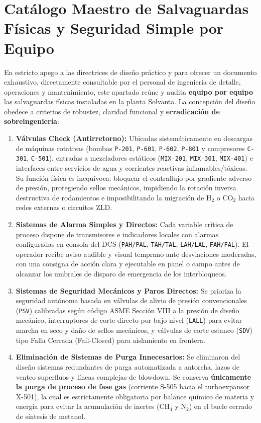 \documentclass[10pt,letterpaper]{article}
\begin{document}
\section{Catálogo Maestro de Salvaguardas Físicas y Seguridad Simple por Equipo} \label{sec:catalogo_equipos}
En estricto apego a las directrices de diseño práctico y para ofrecer un documento exhaustivo, directamente consultable por el personal de ingeniería de detalle, operaciones y mantenimiento, este apartado reúne y audita \textbf{equipo por equipo} las salvaguardas físicas instaladas en la planta Solvanta. La concepción del diseño obedece a criterios de robustez, claridad funcional y \textbf{erradicación de sobreingeniería}:
\begin{enumerate}[leftmargin=*]
    \item \textbf{Válvulas Check (Antirretorno):} Ubicadas sistemáticamente en descargas de máquinas rotativas (bombas \texttt{P-201}, \texttt{P-601}, \texttt{P-602}, \texttt{P-801} y compresores \texttt{C-301}, \texttt{C-501}), entradas a mezcladores estáticos (\texttt{MIX-201}, \texttt{MIX-301}, \texttt{MIX-401}) e interfaces entre servicios de agua y corrientes reactivas inflamables/tóxicas. Su función física es inequívoca: bloquear el contraflujo por gradiente adverso de presión, protegiendo sellos mecánicos, impidiendo la rotación inversa destructiva de rodamientos e imposibilitando la migración de $\text{H}_2$ o $\text{CO}_2$ hacia redes externas o circuitos ZLD.
    \item \textbf{Sistemas de Alarma Simples y Directos:} Cada variable crítica de proceso dispone de transmisores e indicadores locales con alarmas configuradas en consola del DCS (\texttt{PAH/PAL}, \texttt{TAH/TAL}, \texttt{LAH/LAL}, \texttt{FAH/FAL}). El operador recibe aviso audible y visual temprano ante desviaciones moderadas, con una consigna de acción clara y ejecutable en panel o campo antes de alcanzar los umbrales de disparo de emergencia de los interbloqueos.
    \item \textbf{Sistemas de Seguridad Mecánicos y Paros Directos:} Se prioriza la seguridad autónoma basada en válvulas de alivio de presión convencionales (\texttt{PSV}) calibradas según código ASME Sección VIII a la presión de diseño mecánico, interruptores de corte directo por bajo nivel (\texttt{LALL}) para evitar marcha en seco y daño de sellos mecánicos, y válvulas de corte estanco (\texttt{SDV}) tipo Falla Cerrada (Fail-Closed) para aislamiento en frontera.
    \item \textbf{Eliminación de Sistemas de Purga Innecesarios:} Se eliminaron del diseño sistemas redundantes de purga automatizada a antorcha, lazos de venteo superfluos y líneas complejas de blowdown. Se conserva \textbf{únicamente la purga de proceso de fase gas} (corriente S-505 hacia el turboexpansor X-501), la cual es estrictamente obligatoria por balance químico de materia y energía para evitar la acumulación de inertes ($\text{CH}_4$ y $\text{N}_2$) en el bucle cerrado de síntesis de metanol.

\end{enumerate}
\end{document}
